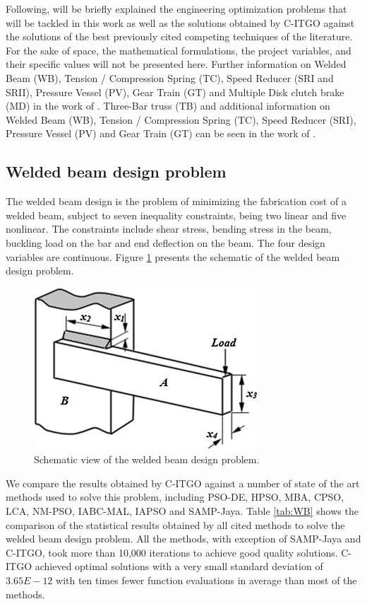 Following, will be briefly explained the engineering optimization problems that will be tackled in this work as well as the solutions obtained by C-ITGO against the solutions of the best previously cited competing techniques of the literature. For the sake of space, the mathematical formulations, the project variables, and their specific values will not be presented here. Further information on Welded Beam (WB), Tension / Compression Spring (TC), Speed Reducer (SRI and SRII), Pressure Vessel (PV), Gear Train (GT) and Multiple Disk clutch brake (MD) in the work of \cite{IAPSO}. Three-Bar truss (TB) and additional information on Welded Beam (WB), Tension / Compression Spring (TC), Speed Reducer (SRI), Pressure Vessel (PV) and Gear Train (GT) can be seen in the work of \cite{MBA}.



\subsection{Welded beam design problem}

The welded beam design \citep{WB} is the problem of minimizing the fabrication cost of a welded beam, subject to seven inequality constraints, being two linear and five nonlinear. The constraints include shear stress, bending stress in the beam, buckling load on the bar and end deflection on the beam. The four design variables are continuous. Figure \ref{fig:WB} presents the schematic of the welded beam design problem.

\begin{figure}[h]
\begin{center}
\includegraphics[scale=0.7]{Imgs/WB.jpg}
\end{center}
\captionsetup{justification=centering}
\caption{Schematic view of the welded beam design problem.}\label{fig:WB}
\end{figure}

We compare the results obtained by C-ITGO against a number of state of the art methods used to solve this problem, including PSO-DE, HPSO, MBA, CPSO, LCA, NM-PSO, IABC-MAL, IAPSO and SAMP-Jaya. Table \ref{tab:WB} shows the comparison of the statistical results obtained by all cited methods to solve the welded beam design problem. All the methods, with exception of SAMP-Jaya and C-ITGO, took more than 10,000 iterations to achieve good quality solutions. C-ITGO achieved optimal solutions with a very small standard deviation of $3.65E \!-\! 12$ with ten times fewer function evaluations in average than most of the methods.

